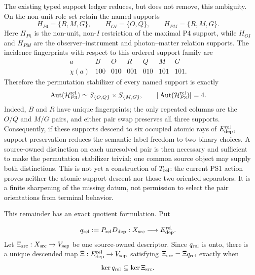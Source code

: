 The existing typed support ledger reduces, but does not remove, this
ambiguity.  On the non-unit role set retain the named supports
\begin{equation}
 H_{P4}=\{B,M,G\},\qquad
 H_{OI}=\{O,Q\},\qquad
 H_{PM}=\{R,M,G\}.
 \label{eq:p3incidencesupports}
\end{equation}
Here $H_{P4}$ is the non-unit, non-$I$ restriction of the maximal P4
support, while $H_{OI}$ and $H_{PM}$ are the observer--instrument and
photon--matter relation supports.  The incidence fingerprints with respect
to this ordered support family are
\begin{equation}
\begin{array}{c|cccccc}
a&B&O&R&Q&M&G\\ \hline
\chi(a)&100&010&001&010&101&101.
\end{array}
\label{eq:p3incidencefingerprints}
\end{equation}
Therefore the permutation stabilizer of every named support is exactly
\begin{equation}
 \operatorname{Aut}(\mathcal H_{P3}^{\rm rel})
 \simeq S_{\{O,Q\}}\times S_{\{M,G\}},
 \qquad |\operatorname{Aut}(\mathcal H_{P3}^{\rm rel})|=4.
 \label{eq:p3incidenceautomorphism}
\end{equation}
Indeed, $B$ and $R$ have unique fingerprints; the only repeated columns are
the $O/Q$ and $M/G$ pairs, and either pair swap preserves all three supports.
Consequently, if these supports descend to six occupied atomic rays of
$E_{\rm dep}^{\rm rel}$, support preservation reduces the semantic label
freedom to two binary choices.  A source-owned distinction on each unresolved
pair is then necessary and sufficient to make the permutation stabilizer
trivial; one common source object may supply both distinctions.  This is not
yet a construction of $T_{\rm rel}$: the current PS1
action proves neither the atomic support descent nor those two oriented
separators.  It is a finite sharpening of the missing datum, not permission
to select the pair orientations from terminal behavior.

This remainder has an exact quotient formulation.  Put

\begin{equation}
 q_{\rm rel}:=P_{\rm rel}D_{\rm dep}:X_{\rm src}
 \longrightarrow E_{\rm dep}^{\rm rel}.
 \label{eq:p3relativequotient}
\end{equation}
Let $\Xi_{\rm src}:X_{\rm src}\to V_{\rm sep}$ be one source-owned
descriptor.  Since $q_{\rm rel}$ is onto, there is a unique descended map
$\bar\Xi:E_{\rm dep}^{\rm rel}\to V_{\rm sep}$ satisfying
$\Xi_{\rm src}=\bar\Xi q_{\rm rel}$ exactly when
\begin{equation}
 \ker q_{\rm rel}\subseteq\ker\Xi_{\rm src}.
 \label{eq:p3selectordescent}
\end{equation}

